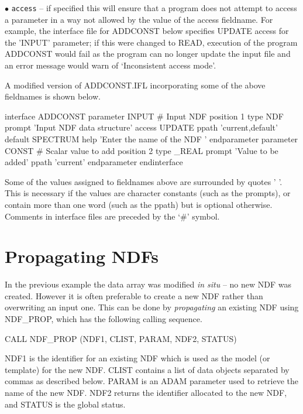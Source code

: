 \documentclass[twoside,11pt,nolof]{starlink}
\begin{document}
\begin{description}
\item{$\bullet$ \tt access} -- if specified this will ensure that a program
does not attempt to access a parameter in a way not allowed by the
value of the access fieldname.
For example, the interface file for ADDCONST below specifies UPDATE access
for the 'INPUT' parameter;
if this
were changed to READ, execution of the program ADDCONST would fail as the
program can no longer update the input file and
an error message would warn of
`Inconsistent access mode'.
\end{description}
A modified version of ADDCONST.IFL incorporating some of the above
fieldnames is shown below.
\begin{terminalv}
interface ADDCONST
  parameter      INPUT          # Input NDF
     position    1
     type        NDF
     prompt      'Input NDF data structure'
     access      UPDATE
     ppath       'current,default'
     default     SPECTRUM
     help        'Enter the name of the NDF '
  endparameter
  parameter      CONST          # Scalar value to add
     position    2
     type        _REAL
     prompt      'Value to be added'
     ppath       'current'
  endparameter
endinterface
\end{terminalv}
Some of the values assigned to fieldnames above are surrounded by quotes ' '.
This is necessary if the values are character constants (such as the prompts),
or contain more than one word (such as the ppath)  but is optional otherwise.
Comments in interface files are preceded by the `\#' symbol.

\newpage
\section{Propagating NDFs\label{prop}}

In the previous  example the data array was modified {\sl in situ} --
no new NDF was created.
However it is often preferable to create a new NDF rather than overwriting an
input one.
This can be done by {\sl propagating\/} an existing NDF using
NDF\_PROP, which has the following calling sequence.
\begin{terminalv}
      CALL NDF_PROP (NDF1, CLIST, PARAM, NDF2, STATUS)
\end{terminalv}
NDF1 is the identifier for an existing NDF which is used
as the model (or template) for the new NDF.
CLIST contains a list of data objects separated by commas as described
below.
PARAM is an ADAM parameter used to retrieve the name of the new  NDF.
NDF2 returns the identifier allocated to the new NDF, and STATUS is the global
status.
\end{document}
